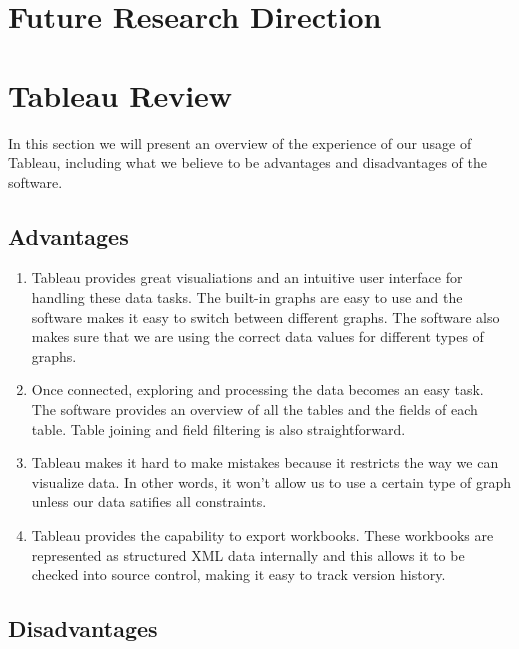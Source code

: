 \documentclass[10pt]{article}
\begin{document}
\section{Future Research Direction}





\section{Tableau Review}

In this section we will present an overview of the experience of our usage of Tableau, including what we believe to be advantages and disadvantages of the software.

\subsection{Advantages}

\begin{enumerate}

\item Tableau provides great visualiations and an intuitive user interface for handling these data tasks. The built-in graphs are easy to use and the software makes it easy to switch between different graphs. The software also makes sure that we are using the correct data values for different types of graphs.

\item Once connected, exploring and processing the data becomes an easy task. The software provides an overview of all the tables and the fields of each table. Table joining and field filtering is also straightforward.

\item Tableau makes it hard to make mistakes because it restricts the way we can visualize data. In other words, it won't allow us to use a certain type of graph unless our data satifies all constraints.

\item Tableau provides the capability to export workbooks. These workbooks are represented as structured XML data internally and this allows it to be checked into source control, making it easy to track version history.

\end{enumerate}

\subsection{Disadvantages}
\end{document}
